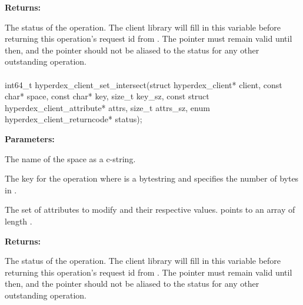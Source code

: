 \noindent\textbf{Returns:}
\begin{description}[labelindent=\widthof{{\code{status}}},leftmargin=*,noitemsep,nolistsep,align=right]
\item[\code{status}] The status of the operation.  The client library will fill in this variable before returning this operation's request id from .  The pointer must remain valid until then, and the pointer should not be aliased to the status for any other outstanding operation.
\end{description}

\paragraph{}
\begin{ccode}
int64_t hyperdex_client_set_intersect(struct hyperdex_client* client,
                const char* space,
                const char* key, size_t key_sz,
                const struct hyperdex_client_attribute* attrs, size_t attrs_sz,
                enum hyperdex_client_returncode* status);
\end{ccode}
\funcdesc 

\noindent\textbf{Parameters:}
\begin{description}[labelindent=\widthof{{\code{attrs}, \code{attrs\_sz}}},leftmargin=*,noitemsep,nolistsep,align=right]
\item[\code{space}] The name of the space as a c-string.
\item[\code{key}, \code{key\_sz}] The key for the operation where  is a bytestring and  specifies the number of bytes in .
\item[\code{attrs}, \code{attrs\_sz}] The set of attributes to modify and their respective values.   points to an array of length .
\end{description}

\noindent\textbf{Returns:}
\begin{description}[labelindent=\widthof{{\code{status}}},leftmargin=*,noitemsep,nolistsep,align=right]
\item[\code{status}] The status of the operation.  The client library will fill in this variable before returning this operation's request id from .  The pointer must remain valid until then, and the pointer should not be aliased to the status for any other outstanding operation.
\end{description}


